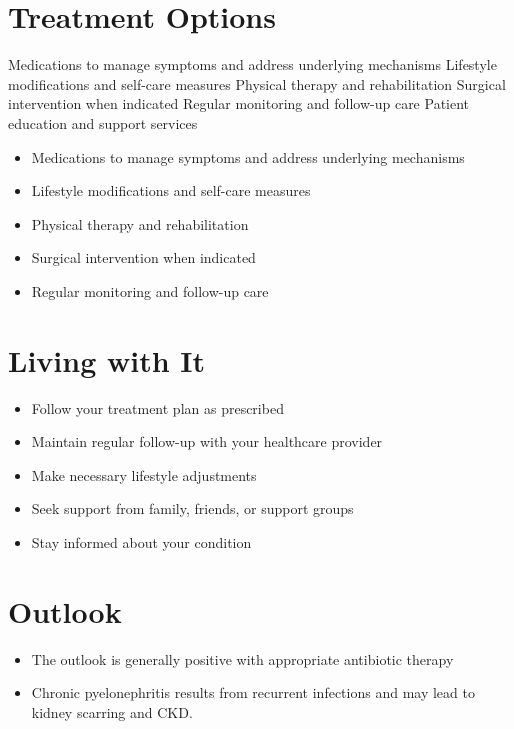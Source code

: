 \section{Treatment Options}
Medications to manage symptoms and address underlying mechanisms Lifestyle modifications and self-care measures Physical therapy and rehabilitation Surgical intervention when indicated Regular monitoring and follow-up care Patient education and support services

\begin{itemize}[noitemsep]
  \item Medications to manage symptoms and address underlying mechanisms
  \item Lifestyle modifications and self-care measures
  \item Physical therapy and rehabilitation
  \item Surgical intervention when indicated
  \item Regular monitoring and follow-up care
\end{itemize}
\section{Living with It}
\begin{itemize}[noitemsep]
  \item Follow your treatment plan as prescribed
  \item Maintain regular follow-up with your healthcare provider
  \item Make necessary lifestyle adjustments
  \item Seek support from family, friends, or support groups
  \item Stay informed about your condition
\end{itemize}
\section{Outlook}
\begin{itemize}[noitemsep]
  \item The outlook is generally positive with appropriate antibiotic therapy
  \item Chronic pyelonephritis results from recurrent infections and may lead to kidney scarring and CKD.
\end{itemize}
